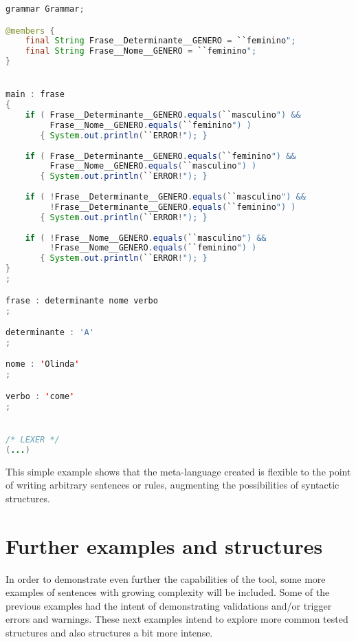 \begin{center}
\begin{minipage}{10cm}
\begin{lstlisting}[language=java, basicstyle=\tiny, label={lst:case_study_sentence}, caption=Example of a specific generated grammar.]
grammar Grammar;

@members {
    final String Frase__Determinante__GENERO = ``feminino";
    final String Frase__Nome__GENERO = ``feminino";
}


main : frase
{
    if ( Frase__Determinante__GENERO.equals(``masculino") &&
         Frase__Nome__GENERO.equals(``feminino") ) 
       { System.out.println(``ERROR!"); }
	
    if ( Frase__Determinante__GENERO.equals(``feminino") &&
         Frase__Nome__GENERO.equals(``masculino") ) 
       { System.out.println(``ERROR!"); }
	
    if ( !Frase__Determinante__GENERO.equals(``masculino") &&
         !Frase__Determinante__GENERO.equals(``feminino") ) 
       { System.out.println(``ERROR!"); }
	
    if ( !Frase__Nome__GENERO.equals(``masculino") &&
         !Frase__Nome__GENERO.equals(``feminino") )
       { System.out.println(``ERROR!"); }
}
;

frase : determinante nome verbo 
;

determinante : 'A'
;

nome : 'Olinda'
;

verbo : 'come'
;


/* LEXER */
(...)
\end{lstlisting}
\end{minipage}
\end{center}


This simple example shows that the meta-language created is flexible to the point of writing arbitrary sentences or rules, 
augmenting the possibilities of syntactic structures.

\section{Further examples and structures}

In order to demonstrate even further the capabilities of the tool, some more examples of sentences with growing complexity will be included.
Some of the previous examples had the intent of demonstrating validations and/or trigger errors and warnings.
These next examples intend to explore more common tested structures and also structures a bit more intense.

